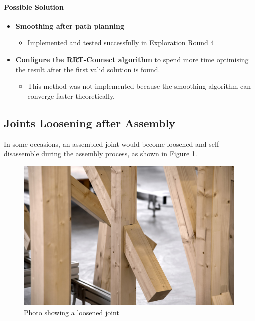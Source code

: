 \paragraph{Possible Solution}
\begin{itemize}
    \item \textbf{Smoothing after path planning}
    \begin{itemize}
        \item Implemented and tested successfully in Exploration Round 4 
    \end{itemize}
    \item \textbf{Configure the RRT-Connect algorithm} to spend more time optimising the result after the first valid solution is found.
    \begin{itemize}
        \item This method was not implemented because the smoothing algorithm can converge faster theoretically.
    \end{itemize}
\end{itemize}

\subsection{Joints Loosening after Assembly}
\label{subsection:exploration-2-joints-loosening-after-assembly}

In some occasions, an assembled joint would become loosened and self-disassemble during the assembly process, as shown in Figure \ref{fig:loosened-joint}.

\begin{figure}
    \centering
    \includegraphics[width=0.99\textwidth]{images/05/image95.jpg}
    \caption{Photo showing a loosened joint}
    \label{fig:loosened-joint}
\end{figure}


